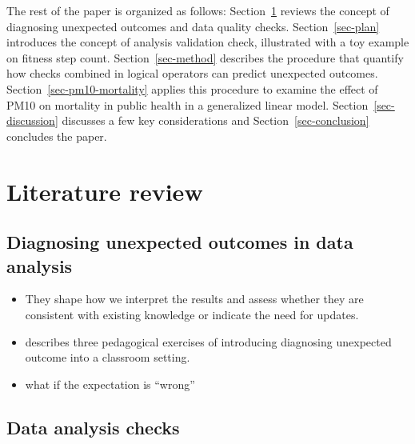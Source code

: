 \documentclass[
  12pt,
]{interact}
\begin{document}
The rest of the paper is organized as follows:
Section~\ref{sec-lit-review} reviews the concept of diagnosing
unexpected outcomes and data quality checks. Section~\ref{sec-plan}
introduces the concept of analysis validation check, illustrated with a
toy example on fitness step count. Section~\ref{sec-method} describes
the procedure that quantify how checks combined in logical operators can
predict unexpected outcomes. Section~\ref{sec-pm10-mortality} applies
this procedure to examine the effect of PM10 on mortality in public
health in a generalized linear model. Section~\ref{sec-discussion}
discusses a few key considerations and Section~\ref{sec-conclusion}
concludes the paper.

\section{Literature review}\label{sec-lit-review}

\subsection{Diagnosing unexpected outcomes in data
analysis}\label{diagnosing-unexpected-outcomes-in-data-analysis}

\begin{itemize}
\item
  They shape how we interpret the results and assess whether they are
  consistent with existing knowledge or indicate the need for updates.
  \citep{grolemund_cognitive_2014}
\item
  \citep{peng_diagnosing_2021} describes three pedagogical exercises of
  introducing diagnosing unexpected outcome into a classroom setting.
\item
  what if the expectation is ``wrong''
\end{itemize}

\subsection{Data analysis checks}\label{data-analysis-checks}
\end{document}
